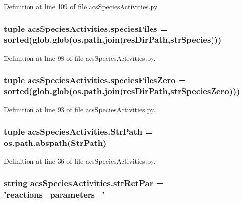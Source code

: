 Definition at line 109 of file acs\-Species\-Activities.\-py.

\hypertarget{a00097_a7e3b3a6b0c9305e60758bf5d44e7b0f6}{
\subsubsection[{species\-Files}]{\setlength{\rightskip}{0pt plus 5cm}tuple acs\-Species\-Activities.\-species\-Files = sorted(glob.\-glob(os.\-path.\-join({\bf res\-Dir\-Path},{\bf str\-Species})))}}\label{a00097_a7e3b3a6b0c9305e60758bf5d44e7b0f6}


Definition at line 98 of file acs\-Species\-Activities.\-py.

\hypertarget{a00097_a2f73b228eca2d5d0e45f781ccc21b253}{
\subsubsection[{species\-Files\-Zero}]{\setlength{\rightskip}{0pt plus 5cm}tuple acs\-Species\-Activities.\-species\-Files\-Zero = sorted(glob.\-glob(os.\-path.\-join({\bf res\-Dir\-Path},{\bf str\-Species\-Zero})))}}\label{a00097_a2f73b228eca2d5d0e45f781ccc21b253}


Definition at line 93 of file acs\-Species\-Activities.\-py.

\hypertarget{a00097_a05f0f829ce4df27678aa19d4e5f10c54}{
\subsubsection[{Str\-Path}]{\setlength{\rightskip}{0pt plus 5cm}tuple acs\-Species\-Activities.\-Str\-Path = os.\-path.\-abspath(Str\-Path)}}\label{a00097_a05f0f829ce4df27678aa19d4e5f10c54}


Definition at line 36 of file acs\-Species\-Activities.\-py.

\hypertarget{a00097_ab59af27efe5462ef13ae45fd7330d0b3}{
\subsubsection[{str\-Rct\-Par}]{\setlength{\rightskip}{0pt plus 5cm}string acs\-Species\-Activities.\-str\-Rct\-Par = 'reactions\-\_\-parameters\-\_\-'}}\label{a00097_ab59af27efe5462ef13ae45fd7330d0b3}


